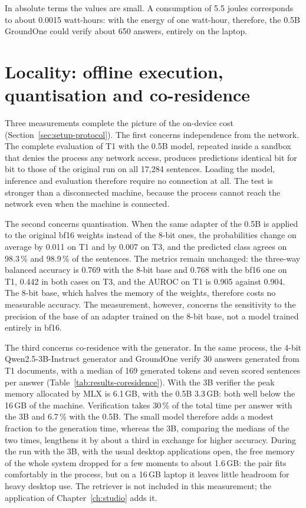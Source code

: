 In absolute terms the values are small. A consumption of 5.5 joules corresponds to about 0.0015 watt-hours: with the
energy of one watt-hour, therefore, the 0.5B GroundOne could verify about 650 answers, entirely on the laptop.

\section{Locality: offline execution, quantisation and co-residence}
\label{sec:results-locality}

Three measurements complete the picture of the on-device cost (Section~\ref{sec:setup-protocol}). The first concerns
independence from the network. The complete evaluation of T1 with the 0.5B model, repeated inside a sandbox that denies
the process any network access, produces predictions identical bit for bit to those of the original run on all 17{,}284
sentences. Loading the model, inference and evaluation therefore require no connection at all. The test is stronger
than a disconnected machine, because the process cannot reach the network even when the machine is connected.

The second concerns quantisation. When the same adapter of the 0.5B is applied to the original bf16 weights instead of
the 8-bit ones, the probabilities change on average by 0.011 on T1 and by 0.007 on T3, and the predicted class agrees on
98.3\,\% and 98.9\,\% of the sentences. The metrics remain unchanged: the three-way balanced accuracy is 0.769 with the
8-bit base and 0.768 with the bf16 one on T1, 0.442 in both cases on T3, and the AUROC on T1 is 0.905 against 0.904. The
8-bit base, which halves the memory of the weights, therefore costs no measurable accuracy. The measurement, however,
concerns the sensitivity to the precision of the base of an adapter trained on the 8-bit base, not a model trained
entirely in bf16.

The third concerns co-residence with the generator. In the same process, the 4-bit Qwen2.5-3B-Instruct generator and
GroundOne verify 30 answers generated from T1 documents, with a median of 169 generated tokens and seven scored
sentences per answer (Table~\ref{tab:results-coresidence}). With the 3B verifier the peak memory allocated by MLX is
6.1\,GB, with the 0.5B 3.3\,GB: both well below the 16\,GB of the machine. Verification takes 30\,\% of the total time
per answer with the 3B and 6.7\,\% with the 0.5B. The small model therefore adds a modest fraction to the generation
time, whereas the 3B, comparing the medians of the two times, lengthens it by about a third in exchange for higher
accuracy. During the run with the 3B, with the usual desktop applications open, the free memory of the whole system
dropped for a few moments to about 1.6\,GB: the pair fits comfortably in the process, but on a 16\,GB laptop it leaves
little headroom for heavy desktop use. The retriever is not included in this measurement; the application of
Chapter~\ref{ch:studio} adds it.


